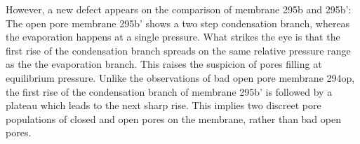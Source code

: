 \documentclass[../thesis.tex]{subfiles}
\begin{document}
          However, a new defect appears on the comparison of membrane 295b and 295b': The open pore membrane 295b' shows a two step condensation branch, whereas the evaporation happens at a single pressure. What strikes the eye is that the first rise of the condensation branch spreads on the same relative pressure range as the the evaporation branch. This raises the suspicion of pores filling at equilibrium pressure. Unlike the observations of bad open pore membrane 294op, the first rise of the condensation branch of membrane 295b' is followed by a plateau which leads to the next sharp rise. This implies two discreet pore populations of closed and open pores on the membrane, rather than bad open pores.

          
\end{document}
